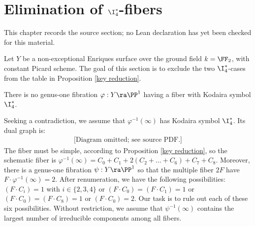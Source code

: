\chapter{Elimination of \texorpdfstring{$\I_4^*$}{I4*}-fibers}
\label{no-enriques-surface-over-the-integers-chapter-13}

\begin{remark}
\label{no-enriques-surface-over-the-integers-chapter-13-source}
This chapter records the source section; no Lean declaration has yet been checked for this material.
\notready
\end{remark}

\label{Elimination I4*}

Let $Y$ be a non-exceptional Enriques surface over the ground field $k=\FF_2$,  with constant Picard scheme.
The goal of this section is   to exclude the two $\I_4^*$-cases from the table in Proposition \ref{key reduction}.

\begin{proposition}
\notready
\label{no I4*}
There is no genus-one fibration
$\varphi:Y\ra\PP^1$ having a fiber  with Kodaira symbol $\I_4^*$.
\end{proposition}

\proof
Seeking a contradiction, we assume that $\varphi^{-1}(\infty)$ has Kodaira symbol $\I_4^*$. Its dual graph is:
\begin{equation*}
\begin{gathered}
\text{[Diagram omitted; see source PDF.]}
\end{gathered}
\end{equation*}
The fiber must be simple, according to   Proposition \ref{key reduction},
so the schematic fiber is  $\varphi^{-1}(\infty) = C_0+C_1+2(C_2+\ldots+C_6)+C_7+C_8$.
Moreover,  there is a genus-one fibration $\psi:Y\ra\PP^1$ so that the multiple fiber $2F$ have  $F\cdot\varphi^{-1}(\infty)=2$.
After renumeration, we have the following   possibilities: $(F\cdot C_i)=1$ with $i\in\{2,3,4\}$
or $(F\cdot C_0)=(F\cdot C_1)=1$ or $(F\cdot C_0)=(F\cdot C_8)=1$ or $(F\cdot C_0)=2$.
Our task is to rule out each of these six possibilities.
Without restriction, we assume that   $\psi^{-1}(\infty)$ contains the largest number of irreducible components
among all fibers.

